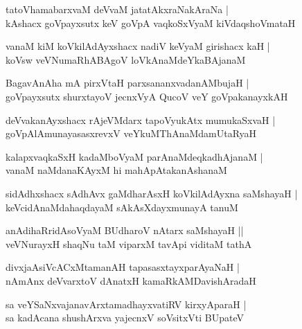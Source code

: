\documentclass[twoside,12pt,openright]{book}
\newcounter{shloka}[chapter]
\begin{document}
\begin{shloka}%
tatoVhamabarxvaM deVvaM jatatAkxraNakAraNa |\\
kAshacx goVpayxsutx keV goVpA vaqkoSxVyaM kiVdaqshoVmataH 
\end{shloka}

\begin{shloka}%
vanaM kiM koVkilAdAyxshacx nadiV keVyaM girishacx kaH |\\
koVsw veVNumaRhABAgoV loVkAnaMdeYkaBAjanaM 
\end{shloka}

\begin{shloka}%
BagavAnAha mA pirxVtaH parxsananxvadanAMbujaH |\\
goVpayxsutx shurxtayoV jecnxVyA QucoV veY goVpakanayxkAH 
\end{shloka}

\begin{shloka}%
deVvakanAyxshacx rAjeVMdarx tapoVyukAtx mumukaSxvaH |\\
goVpAlAmunayasasxrevxV veYkuMThAnaMdamUtaRyaH 
\end{shloka}

\begin{shloka}%
kalapxvaqkaSxH kadaMboVyaM parAnaMdeqkadhAjanaM |\\
vanaM naMdanaKAyxM hi mahApAtakanAshanaM 
\end{shloka}

\begin{shloka}%
sidAdhxshacx sAdhAvx gaMdharAsxH koVkilAdAyxna saMshayaH |\\
keVcidAnaMdahaqdayaM sAkAsXdayxmunayA tanuM 
\end{shloka}

\begin{shloka}%
anAdihaRridAsoVyaM BUdharoV nAtarx saMshayaH ||\\
veVNurayxH shaqNu taM viparxM tavApi viditaM tathA 
\end{shloka}

\begin{shloka}%
divxjaAsiVcACxMtamanAH tapasasxtayxparAyaNaH |\\
nAmAnx deVvarxtoV dAnatxH kamaRkAMDavishAradaH 
\end{shloka}

\begin{shloka}%
sa veYSaNxvajanavArxtamadhayxvatiRV kirxyAparaH |\\
sa kadAcana shushArxva yajecnxV soVsitxVti BUpateV 
\end{shloka}
\end{document}
